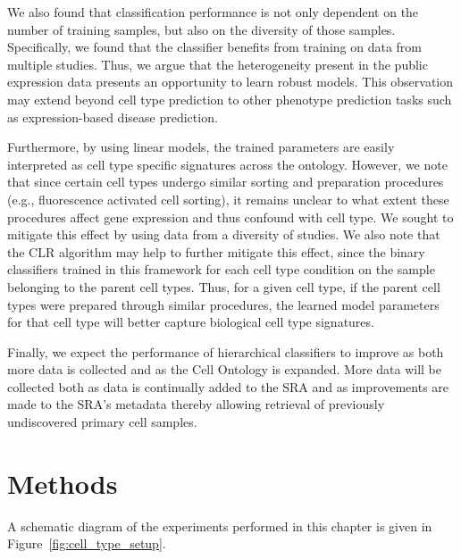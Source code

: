 We also found that classification performance is not only dependent on the number of training samples, but also on the diversity of those samples. Specifically, we found that the classifier benefits from training on data from multiple studies. Thus, we argue that the heterogeneity present in the public expression data presents an opportunity to learn robust models. This observation may extend beyond cell type prediction to other phenotype prediction tasks such as expression-based disease prediction.

Furthermore, by using linear models, the trained parameters are easily interpreted as cell type specific signatures across the ontology.  However, we note that since certain cell types undergo similar sorting and preparation procedures (e.g., fluorescence activated cell sorting), it remains unclear to what extent these procedures affect gene expression and thus confound with cell type. We sought to mitigate this effect by using data from a diversity of studies.  We also note that the CLR algorithm may help to further mitigate this effect, since the binary classifiers trained in this framework for each cell type condition on the sample belonging to the parent cell types. Thus, for a given cell type, if the parent cell types were prepared through similar procedures, the learned model parameters for that cell type will better capture biological cell type signatures. 

Finally, we expect the performance of hierarchical classifiers to improve as both more data is collected and as the Cell Ontology is expanded. More data will be collected both as data is continually added to the SRA and as improvements are made to the SRA's metadata thereby allowing retrieval of previously undiscovered primary cell samples.   

\section{Methods}
A schematic diagram of the experiments performed in this chapter is given in Figure~\ref{fig:cell_type_setup}.

